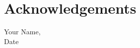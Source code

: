 
\setcounter{footnote}{0}


\chapter{Acknowledgements}


\vspace{10mm}

\raggedleft
Your Name, \\
Date




